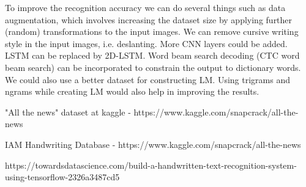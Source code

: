 \documentclass[a4paper, 10pt,twocolumn]{article}
\begin{document}
To improve the recognition accuracy we can do several things such as data augmentation, which involves increasing the dataset size by applying further (random) transformations to the input images. We can remove cursive writing style in the input images, i.e. deslanting. More CNN layers could be added. LSTM can be replaced by 2D-LSTM. Word beam search decoding (CTC word beam search) can be incorporated to constrain the output to dictionary words. We could also use a better dataset for constructing LM. Using trigrams and ngrams while creating LM would also help in improving the results.

\begin{thebibliography}{9}


 "All the news" dataset at kaggle - https://www.kaggle.com/snapcrack/all-the-news

 IAM Handwriting Database - https://www.kaggle.com/snapcrack/all-the-news

\bibitem{} https://towardsdatascience.com/build-a-handwritten-text-recognition-system-using-tensorflow-2326a3487cd5


\end{thebibliography}
\end{document}

